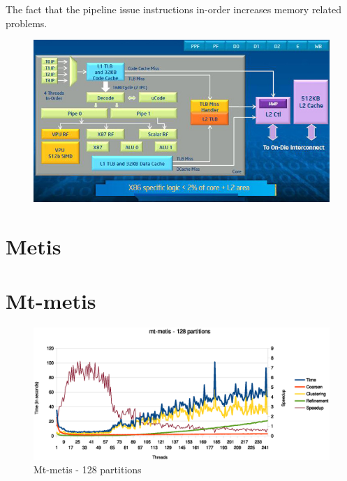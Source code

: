 \documentclass[abstract=on,9pt,twocolumn]{scrartcl}
\begin{document}
The fact that the pipeline issue instructions in-order increases
memory related problems. %

\begin{center}
\begin{figure}[htbp]
    \includegraphics[scale=.45]{img/phi_arch.jpg}
\end{figure}
\end{center}



\section{Metis}



\section{Mt-metis}

\begin{center}
\begin{figure}[htbp]
    \includegraphics[scale=.40]{img/mtmetis128.eps}
    \caption{Mt-metis - 128 partitions}
\end{figure}
\end{center}
\end{document}
